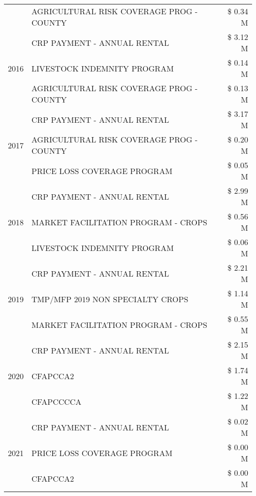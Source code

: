 \begin{tabular}{llr}
 & AGRICULTURAL RISK COVERAGE PROG - COUNTY & \$ 0.34 M \\
\cline{1-3}
\multirow[t]{3}{*}{2016} & CRP PAYMENT - ANNUAL RENTAL & \$ 3.12 M \\
 & LIVESTOCK INDEMNITY PROGRAM & \$ 0.14 M \\
 & AGRICULTURAL RISK COVERAGE PROG - COUNTY & \$ 0.13 M \\
\cline{1-3}
\multirow[t]{3}{*}{2017} & CRP PAYMENT - ANNUAL RENTAL & \$ 3.17 M \\
 & AGRICULTURAL RISK COVERAGE PROG - COUNTY & \$ 0.20 M \\
 & PRICE LOSS COVERAGE PROGRAM & \$ 0.05 M \\
\cline{1-3}
\multirow[t]{3}{*}{2018} & CRP PAYMENT - ANNUAL RENTAL & \$ 2.99 M \\
 & MARKET FACILITATION PROGRAM - CROPS & \$ 0.56 M \\
 & LIVESTOCK INDEMNITY PROGRAM & \$ 0.06 M \\
\cline{1-3}
\multirow[t]{3}{*}{2019} & CRP PAYMENT - ANNUAL RENTAL & \$ 2.21 M \\
 & TMP/MFP 2019 NON SPECIALTY CROPS & \$ 1.14 M \\
 & MARKET FACILITATION PROGRAM - CROPS & \$ 0.55 M \\
\cline{1-3}
\multirow[t]{3}{*}{2020} & CRP PAYMENT - ANNUAL RENTAL & \$ 2.15 M \\
 & CFAPCCA2 & \$ 1.74 M \\
 & CFAPCCCCA & \$ 1.22 M \\
\cline{1-3}
\multirow[t]{3}{*}{2021} & CRP PAYMENT - ANNUAL RENTAL & \$ 0.02 M \\
 & PRICE LOSS COVERAGE PROGRAM & \$ 0.00 M \\
 & CFAPCCA2 & \$ 0.00 M \\
\cline{1-3}
\bottomrule
\end{tabular}
